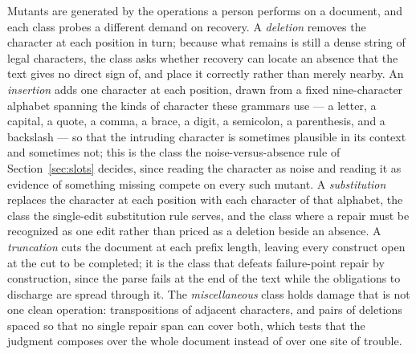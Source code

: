 \documentclass[manuscript]{acmart}
\begin{document}
Mutants are generated by the operations a person performs on a document, and each class probes a different demand on recovery. A \emph{deletion} removes the character at each position in turn; because what remains is still a dense string of legal characters, the class asks whether recovery can locate an absence that the text gives no direct sign of, and place it correctly rather than merely nearby. An \emph{insertion} adds one character at each position, drawn from a fixed nine-character alphabet spanning the kinds of character these grammars use --- a letter, a capital, a quote, a comma, a brace, a digit, a semicolon, a parenthesis, and a backslash --- so that the intruding character is sometimes plausible in its context and sometimes not; this is the class the noise-versus-absence rule of Section~\ref{sec:slots} decides, since reading the character as noise and reading it as evidence of something missing compete on every such mutant. A \emph{substitution} replaces the character at each position with each character of that alphabet, the class the single-edit substitution rule serves, and the class where a repair must be recognized as one edit rather than priced as a deletion beside an absence. A \emph{truncation} cuts the document at each prefix length, leaving every construct open at the cut to be completed; it is the class that defeats failure-point repair by construction, since the parse fails at the end of the text while the obligations to discharge are spread through it. The \emph{miscellaneous} class holds damage that is not one clean operation: transpositions of adjacent characters, and pairs of deletions spaced so that no single repair span can cover both, which tests that the judgment composes over the whole document instead of over one site of trouble.
\end{document}
